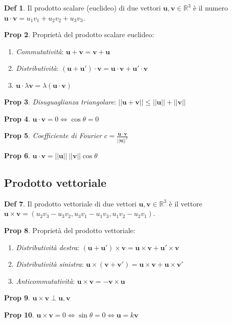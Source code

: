 \documentclass[]{article}
\newcommand{\bl}[1]{\mathbf{#1}}
\newcommand{\vu}{\mathbf{u}}
\newcommand{\vv}{\mathbf{v}}
\theoremstyle{definition}
\theoremstyle{definition}
\newtheorem{prop}{Prop}[subsection]
\theoremstyle{definition}
\newtheorem{dfn}[prop]{Def}
\begin{document}
\begin{dfn} Il prodotto scalare (euclideo) di due vettori $\vu, \vv \in \mathbb{R}^3$ è il numero $\vu \cdot \vv = u_1 v_1 + u_2 v_2 + u_3 v_3$.

 \end{dfn} \begin{prop} Proprietà del prodotto scalare euclideo:
\begin{enumerate}
	\item \emph{Commutatività}: $\vu + \vv = \vv + \vu$ 
	\item \emph{Distributività}: $(\vu + \bl{u'}) \cdot \vv = \vu \cdot \vv + \bl{u'} \cdot \vv $ 
	\item $\vu \cdot \lambda \vv = \lambda (\vu \cdot \vv) $
\end{enumerate}

\end{prop} \begin{prop} \emph{Disuguaglianza triangolare}: $||\vu+\vv|| \leq ||\vu|| + ||\vv|| $
 
\end{prop} \begin{prop} $\vu \cdot \vv = 0 \Leftrightarrow \cos \theta = 0$

\end{prop} \begin{prop} \emph{Coefficiente di Fourier} $c=\frac{\vu \cdot \vv}{||\vu||^2}$

\end{prop} \begin{prop} $\vu \cdot \vv = ||\vu|| \ ||\vv|| \cos \theta $
\end{prop} 

\subsection{Prodotto vettoriale}

 \begin{dfn} Il prodotto vettoriale di due vettori $\vu, \vv \in \mathbb{R}^3$ è il vettore $\vu \times \vv = (u_2 v_3 - u_3 v_2, u_3 v_1 - u_1 v_3, u_1 v_2 - u_2 v_1)$.

 \end{dfn} \begin{prop} Proprietà del prodotto vettoriale:
\begin{enumerate}
\item \emph{Distributività destra}: $(\vu + \bl{u'}) \times \vv = \vu \times \vv + \bl{u'} \times \vv $ 
\item \emph{Distributività sinistra}: $\vu \times (\vv + \bl{v'}) = \vu \times \vv + \vu \times \bl{v'} $
\item \emph{Anticommutatività}: $\vu \times \vv = - \vv \times \vu $
\end{enumerate}

\end{prop} \begin{prop} $\vu \times \vv \perp \vu,\vv$

\end{prop} \begin{prop} $\vu \times \vv = 0 \Leftrightarrow \sin \theta = 0 \Leftrightarrow \vu=k \vv$
\end{prop}
\end{document}

